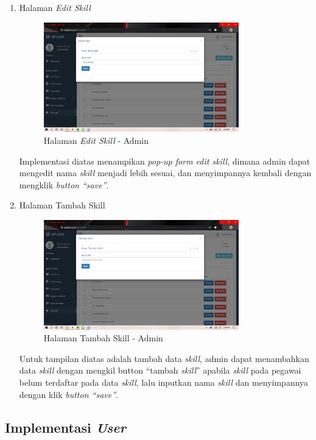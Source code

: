 \begin{enumerate}
	\item Halaman \textit{Edit Skill}
	\begin{figure}
		\centering
		\includegraphics[width=0.8\textwidth]
		{pics/admin/implementasi/editskill.png}
		\caption{Halaman \textit{Edit Skill} - Admin}
		\label{fig:CC10}
	\end{figure}
	Implementasi diatas menampikan \textit{pop-up form edit skill}, dimana admin dapat mengedit nama \textit{skill} menjadi lebih sesuai, dan menyimpannya kembali dengan mengklik \textit{button “save”}.
	
	\item Halaman Tambah Skill
	\begin{figure}
		\centering
		\includegraphics[width=0.8\textwidth]
		{pics/admin/implementasi/tambahskill.png}
		\caption{Halaman Tambah Skill - Admin}
		\label{fig:CC10}
	\end{figure}
	Untuk tampilan diatas adalah tambah data \textit{skill}, admin dapat menambahkan data \textit{skill} dengan mengkil button “tambah \textit{skill}” apabila \textit{skill} pada pegawai belum terdaftar pada data \textit{skill}, lalu inputkan nama \textit{skill} dan menyimpannya dengan klik \textit{button “save”}.
	
\end{enumerate}

\subsection{Implementasi \textit{User}}

